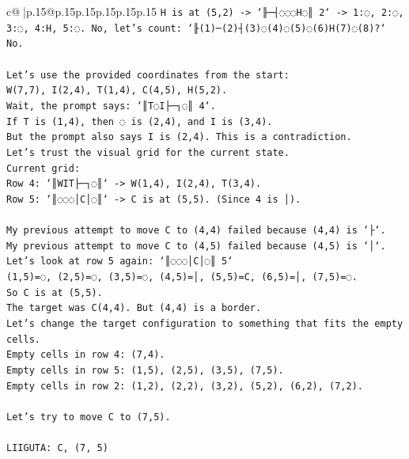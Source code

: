 \documentclass{article}
\begin{document}
{\begin{supertabular}{c@{$\;$}|p{.15\linewidth}@{}p{.15\linewidth}p{.15\linewidth}p{.15\linewidth}p{.15\linewidth}p{.15\linewidth}}
{{{\texttt{H is at (5,2) {-}> `╟─┤◌◌◌H◌║ 2` {-}> 1:◌, 2:◌, 3:◌, 4:H, 5:◌. No, let's count: `╟(1)─(2)┤(3)◌(4)◌(5)◌(6)H(7)◌(8)?` No.} \\
\\ 
\texttt{Let's use the provided coordinates from the start:} \\
\texttt{W(7,7), I(2,4), T(1,4), C(4,5), H(5,2).} \\
\texttt{Wait, the prompt says: `║T◌I├─┐◌║ 4`.} \\
\texttt{If T is (1,4), then ◌ is (2,4), and I is (3,4).} \\
\texttt{But the prompt also says I is (2,4). This is a contradiction.} \\
\texttt{Let's trust the visual grid for the current state.} \\
\texttt{Current grid:} \\
\texttt{Row 4: `║WIT├─┐◌║` {-}> W(1,4), I(2,4), T(3,4).} \\
\texttt{Row 5: `║◌◌◌│C│◌║` {-}> C is at (5,5). (Since 4 is │).} \\
\\ 
\texttt{My previous attempt to move C to (4,4) failed because (4,4) is `├`.} \\
\texttt{My previous attempt to move C to (4,5) failed because (4,5) is `│`.} \\
\texttt{Let's look at row 5 again: `║◌◌◌│C│◌║ 5`} \\
\texttt{(1,5)=◌, (2,5)=◌, (3,5)=◌, (4,5)=│, (5,5)=C, (6,5)=│, (7,5)=◌.} \\
\texttt{So C is at (5,5).} \\
\texttt{The target was C(4,4). But (4,4) is a border.} \\
\texttt{Let's change the target configuration to something that fits the empty cells.} \\
\texttt{Empty cells in row 4: (7,4).} \\
\texttt{Empty cells in row 5: (1,5), (2,5), (3,5), (7,5).} \\
\texttt{Empty cells in row 2: (1,2), (2,2), (3,2), (5,2), (6,2), (7,2).} \\
\\ 
\texttt{Let's try to move C to (7,5).} \\
\\ 
\texttt{LIIGUTA: C, (7, 5)} \\
            }
        }
    }
     \\ \\


\end{supertabular}}
\end{document}
